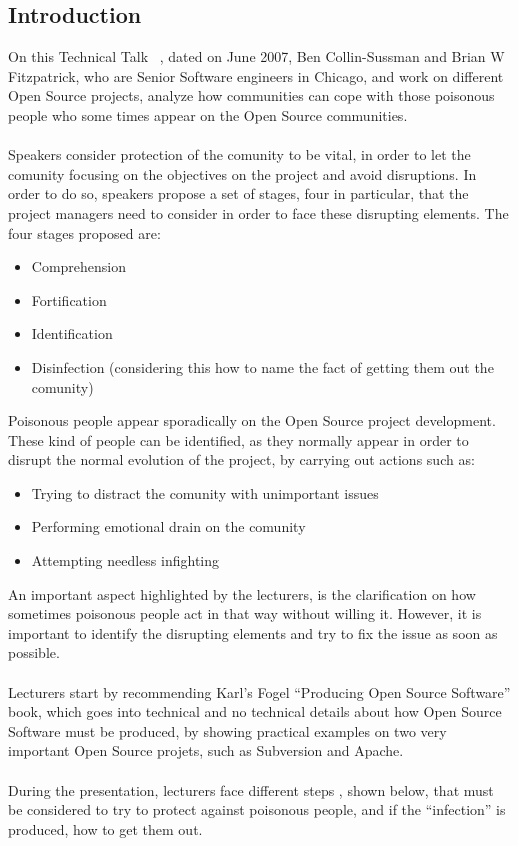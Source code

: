 \documentclass[11pt]{article}
\begin{document}
\subsection{Introduction}
On this Technical Talk ~\cite{TALK01}, dated on June 2007, Ben Collin-Sussman and Brian W Fitzpatrick, who are Senior Software engineers in Chicago, and work on different Open Source projects, analyze how communities can cope with those poisonous people who some times appear on the Open Source communities.\\
\\
Speakers consider protection of the comunity to be vital, in order to let the comunity focusing on the objectives on the project and avoid disruptions.
In order to do so, speakers propose a set of stages, four in particular, that the project managers need to consider in order to face these disrupting elements. The four stages proposed are:
\begin{itemize}\itemsep0pt
\item{Comprehension}
\item{Fortification}
\item{Identification}
\item{Disinfection (considering this how to name the fact of getting them out the comunity)}
\end{itemize}
Poisonous people appear sporadically on the Open Source project development. These kind of people can be identified, as they normally appear in order to disrupt the normal evolution of the project, by carrying out actions such as:
\begin{itemize}\itemsep0pt
\item{Trying to distract the comunity with unimportant issues}
\item{Performing emotional drain on the comunity}
\item{Attempting needless infighting}
\end{itemize}
An important aspect highlighted by the lecturers, is the clarification on how sometimes poisonous people act in that way without willing it. However, it is important to identify the disrupting elements and try to fix the issue as soon as possible.\\
\\
Lecturers start by recommending Karl's Fogel ``Producing Open Source Software'' book, which goes into technical and no technical details about how Open Source Software must be produced, by showing practical examples on two very important Open Source projets, such as Subversion and Apache.\\
\\
During the presentation, lecturers face different steps , shown below, that must be considered to try to protect against poisonous people, and if the ``infection'' is produced, how to get them out.\\
\end{document}
